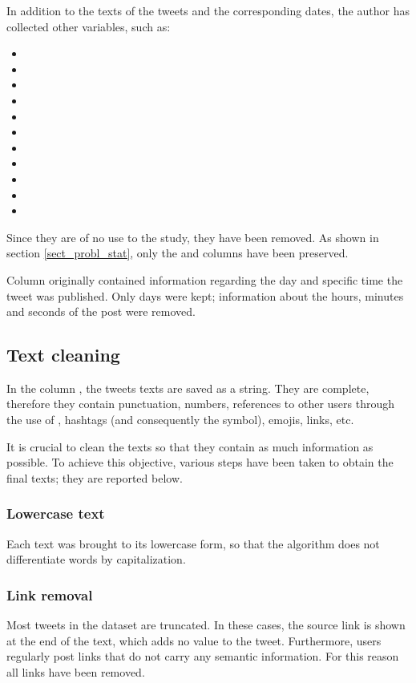 In addition to the texts of the tweets and the corresponding dates, the author has collected other variables, such as: 
\begin{itemize}
  \item {}
  \item {}
  \item {}
  \item {}
  \item {}
  \item {}
  \item {}
  \item {}
  \item {}
  \item {}
  \item {}
\end{itemize}

Since they are of no use to the study, they have been removed. As shown in section \ref{sect_probl_stat}, only the  and  columns have been preserved.

Column  originally contained information regarding the day and specific time the tweet was published. Only days were kept; information about the hours, minutes and seconds of the post were removed.

\subsection*{Text cleaning}

In the column , the tweets texts are saved as a string. They are complete, therefore they contain punctuation, numbers, references to other users through the use of , hashtags (and consequently the \code{\#} symbol), emojis, links, etc.

It is crucial to clean the texts so that they contain as much information as possible. To achieve this objective, various steps have been taken to obtain the final texts; they are reported below.

\subsubsection*{Lowercase text}
Each text was brought to its lowercase form, so that the algorithm does not differentiate words by capitalization.

\subsubsection*{Link removal}
Most tweets in the dataset are truncated. In these cases, the source link is shown at the end of the text, which adds no value to the tweet. Furthermore, users regularly post links that do not carry any semantic information. For this reason all links have been removed.

